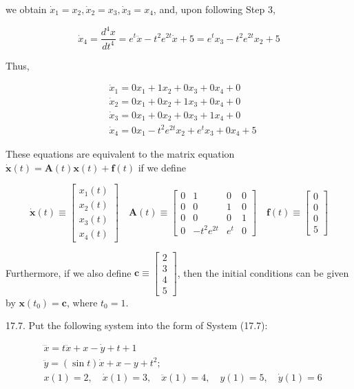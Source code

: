 \documentclass[10pt]{article}
\begin{document}
we obtain $\dot{x}_{1}=x_{2}, \dot{x}_{2}=x_{3}, \dot{x}_{3}=x_{4}$, and, upon following Step 3,

$$
\dot{x}_{4}=\frac{d^{4} x}{d t^{4}}=e^{t} \ddot{x}-t^{2} e^{2 t} \dot{x}+5=e^{t} x_{3}-t^{2} e^{2 t} x_{2}+5
$$

Thus,

$$
\begin{aligned}
& \dot{x}_{1}=0 x_{1}+1 x_{2}+0 x_{3}+0 x_{4}+0 \\
& \dot{x}_{2}=0 x_{1}+0 x_{2}+1 x_{3}+0 x_{4}+0 \\
& \dot{x}_{3}=0 x_{1}+0 x_{2}+0 x_{3}+1 x_{4}+0 \\
& \dot{x}_{4}=0 x_{1}-t^{2} e^{2 t} x_{2}+e^{t} x_{3}+0 x_{4}+5
\end{aligned}
$$

These equations are equivalent to the matrix equation $\dot{\mathbf{x}}(t)=\mathbf{A}(t) \mathbf{x}(t)+\mathbf{f}(t)$ if we define

$$
\dot{\mathbf{x}}(t) \equiv\left[\begin{array}{c}
x_{1}(t) \\
x_{2}(t) \\
x_{3}(t) \\
x_{4}(t)
\end{array}\right] \quad \mathbf{A}(t) \equiv\left[\begin{array}{cccc}
0 & 1 & 0 & 0 \\
0 & 0 & 1 & 0 \\
0 & 0 & 0 & 1 \\
0 & -t^{2} e^{2 t} & e^{t} & 0
\end{array}\right] \quad \mathbf{f}(t) \equiv\left[\begin{array}{l}
0 \\
0 \\
0 \\
5
\end{array}\right]
$$

Furthermore, if we also define $\mathbf{c} \equiv\left[\begin{array}{l}2 \\ 3 \\ 4 \\ 5\end{array}\right]$, then the initial conditions can be given by $\mathbf{x}\left(t_{0}\right)=\mathbf{c}$, where $t_{0}=1$.

17.7. Put the following system into the form of System (17.7):

$$
\begin{aligned}
& \dddot{x}=t \ddot{x}+x-\dot{y}+t+1 \\
& \ddot{y}=(\sin t) \dot{x}+x-y+t^{2} ; \\
& x(1)=2, \quad \dot{x}(1)=3, \quad \ddot{x}(1)=4, \quad y(1)=5, \quad \dot{y}(1)=6
\end{aligned}
$$
\end{document}
